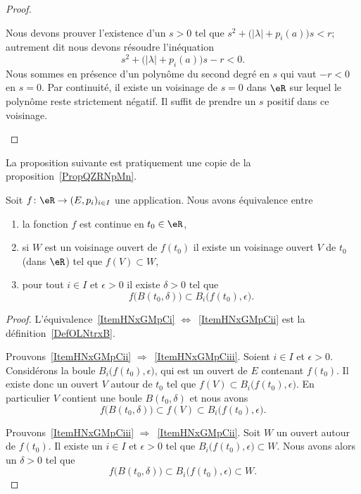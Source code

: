 \begin{proof}
\begin{subproof}
		Nous devons prouver l'existence d'un \( s>0\) tel que \( s^2+\big( | \lambda |+p_i(a) \big)s < r\); autrement dit nous devons résoudre l'inéquation
		\begin{equation}
			s^2+\big( | \lambda |+p_i(a) \big)s-r< 0.
		\end{equation}
		Nous sommes en présence d'un polynôme du second degré en \( s\) qui vaut \( -r<0\) en \( s=0\). Par continuité, il existe un voisinage de \( s=0\) dans \( \eR\) sur lequel le polynôme reste strictement négatif. Il suffit de prendre un \( s\) positif dans ce voisinage.
	\end{subproof}
\end{proof}


La proposition suivante est pratiquement une copie de la proposition~\ref{PropQZRNpMn}.
\begin{proposition} \label{PropNGjQnqF}
	Soit \( f\colon \eR\to (E,p_i)_{i\in I}\) une application. Nous avons équivalence entre
	\begin{enumerate}
		\item   \label{ItemHNxGMpCi}
		      la fonction \( f\) est continue en \( t_0\in \eR\),
		\item\label{ItemHNxGMpCii}
		      si \( W\) est un voisinage ouvert de \( f(t_0)\) il existe un voisinage ouvert \( V\) de \( t_0\) (dans \( \eR\)) tel que \( f(V)\subset W\),
		\item\label{ItemHNxGMpCiii}
		      pour tout \( i\in I\) et \( \epsilon>0\) il existe \( \delta>0\) tel que
		      \begin{equation}
			      f\big( B(t_0,\delta) \big)\subset B_i\big( f(t_0),\epsilon \big).
		      \end{equation}
	\end{enumerate}
\end{proposition}

\begin{proof}
	L'équivalence~\ref{ItemHNxGMpCi} \( \Leftrightarrow\)~\ref{ItemHNxGMpCii} est la définition~\ref{DefOLNtrxB}.

	Prouvons~\ref{ItemHNxGMpCii} \( \Rightarrow\)~\ref{ItemHNxGMpCiii}. Soient \( i\in I\) et \( \epsilon>0\). Considérons la boule \( B_i\big( f(t_0),\epsilon \big)\), qui est un ouvert de \( E\) contenant \( f(t_0)\). Il existe donc un ouvert \( V\) autour de \( t_0\) tel que \( f(V)\subset B_i\big( f(t_0),\epsilon \big)\). En particulier \( V\) contient une boule \( B(t_0,\delta)\) et nous avons
	\begin{equation}
		f\big( B(t_0,\delta) \big)\subset f(V)\subset B_i\big( f(t_0),\epsilon \big).
	\end{equation}

	Prouvons~\ref{ItemHNxGMpCiii} \( \Rightarrow\)~\ref{ItemHNxGMpCii}. Soit \( W\) un ouvert autour de \( f(t_0)\). Il existe un \( i\in I\) et \( \epsilon>0\) tel que \( B_i\big( f(t_0),\epsilon \big)\subset W\). Nous avons alors un \( \delta>0\) tel que
	\begin{equation}
		f\big( B(t_0,\delta) \big)\subset B_i\big( f(t_0),\epsilon \big)\subset W.
	\end{equation}
\end{proof}

